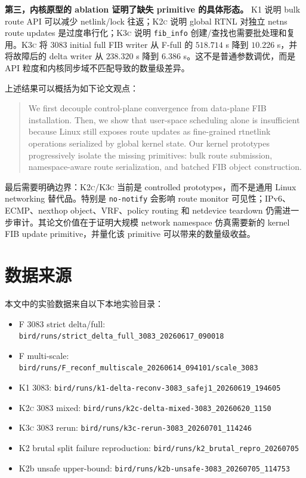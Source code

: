 \documentclass[UTF8]{ctexart}
\newcommand{\code}[1]{\texttt{#1}}
\newcommand{\method}[1]{\textsc{#1}}
\begin{document}
\textbf{第三，内核原型的 ablation 证明了缺失 primitive 的具体形态。}
\method{K1} 说明 bulk route API 可以减少 netlink/lock 往返；\method{K2c} 说明 global RTNL 对独立 netns route updates 是过度串行化；\method{K3c} 说明 \code{fib\_info} 创建/查找也需要批处理和复用。\method{K3c} 将 3083 initial full FIB writer 从 \method{F}-full 的 $518.714$ s 降到 $10.226$ s，并将故障后的 delta writer 从 $238.320$ s 降到 $6.386$ s。这不是普通参数调优，而是 API 粒度和内核同步域不匹配导致的数量级差异。

上述结果可以概括为如下论文观点：

\begin{quote}
We first decouple control-plane convergence from data-plane FIB installation.
Then, we show that user-space scheduling alone is insufficient because Linux
still exposes route updates as fine-grained rtnetlink operations serialized by
global kernel state. Our kernel prototypes progressively isolate the missing
primitives: bulk route submission, namespace-aware route serialization, and
batched FIB object construction.
\end{quote}

最后需要明确边界：\method{K2c}/\method{K3c} 当前是 controlled prototypes，而不是通用 Linux networking 替代品。特别是 \code{no-notify} 会影响 route monitor 可见性；IPv6、ECMP、nexthop object、VRF、policy routing 和 netdevice teardown 仍需进一步审计。其论文价值在于证明大规模 network namespace 仿真需要新的 kernel FIB update primitive，并量化该 primitive 可以带来的数量级收益。

\section{数据来源}

本文中的实验数据来自以下本地实验目录：

\begin{itemize}[leftmargin=1.5em]
  \item \method{F} 3083 strict delta/full: \code{bird/runs/strict\_delta\_full\_3083\_20260617\_090018}
  \item \method{F} multi-scale: \code{bird/runs/F\_reconf\_multiscale\_20260614\_094101/scale\_3083}
  \item \method{K1} 3083: \code{bird/runs/k1-delta-reconv-3083\_safej1\_20260619\_194605}
  \item \method{K2c} 3083 mixed: \code{bird/runs/k2c-delta-mixed-3083\_20260620\_1150}
  \item \method{K3c} 3083 rerun: \code{bird/runs/k3c-rerun-3083\_20260701\_114246}
  \item K2 brutal split failure reproduction: \code{bird/runs/k2\_brutal\_repro\_20260705}
  \item K2b unsafe upper-bound: \code{bird/runs/k2b-unsafe-3083\_20260705\_114753}
\end{itemize}
\end{document}
